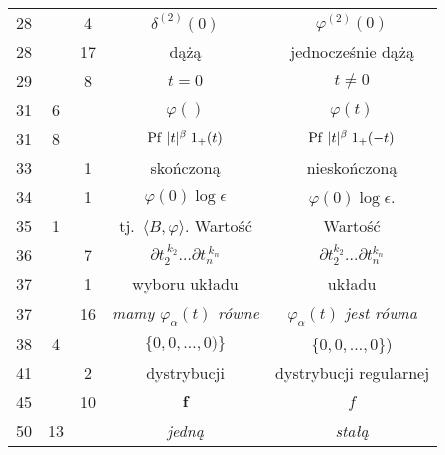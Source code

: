 \documentclass[a4paper,11pt]{article}
\begin{document}
\begin{center}
\begin{tabular}{|c|c|c|c|c|}
    28  & & \hphantom{0}4 & $\delta^{ ( 2 ) }( 0 )$ & $\varphi^{ ( 2 ) }( 0 )$ \\
    28  & & 17 & dążą & jednocześnie dążą \\
    29  & & \hphantom{0}8 & $t = 0$ & $t \neq 0$ \\
    31  & \hphantom{0}6 & & $\varphi( )$ & $\varphi( t )$ \\
    31  & \hphantom{0}8 & & $\mathrm{Pf}\, \, | t |^{ \beta } \; 1_{ + }( t )$
           & $\mathrm{Pf}\, \, | t |^{ \beta } \; 1_{ + }( -t )$ \\
    33  & & \hphantom{0}1 & skończoną & nieskończoną \\
    34  & & \hphantom{0}1 & $\varphi( 0 ) \log \epsilon$ & $\varphi( 0 ) \log \epsilon$. \\
    35 & \hphantom{0}1 & & tj.~$\langle B, \varphi \rangle$. Wartość & Wartość \\
    36 & & \hphantom{0}7 & $\partial t_{ 2 }^{ \: k_{ 2 } } \ldots \partial t_{ n }^{ \: k_{ n } }$
           & $\partial t_{ 2 }^{ k_{ 2 } } \ldots \partial t_{ n }^{ k_{ n } }$ \\
    37 & & \hphantom{0}1 & wyboru układu & układu \\
    37 & & 16 & \textit{mamy $\varphi_{ \alpha }( t )$ równe}
           & \textit{$\varphi_{ \alpha }( t )$ jest równa} \\
    38  & \hphantom{0}4 & & $\{ 0, 0, \ldots, 0 ) \}$ & $\{ 0, 0, \ldots, 0 \}$) \\
    41  & & \hphantom{0}2 & dystrybucji & dystrybucji regularnej \\
    45  & & 10 & $\boldsymbol{f}$ & $f$ \\
    50  & 13 & & \textit{jedną} & \textit{stałą} \\
    \hline
  \end{tabular}




\end{center}
\end{document}
